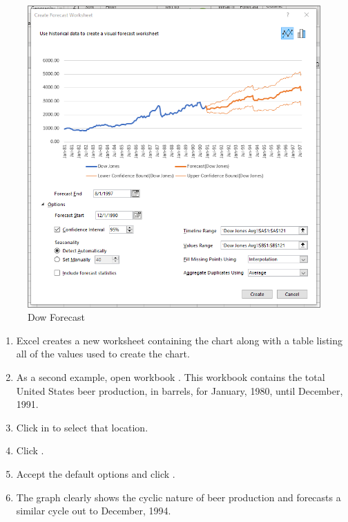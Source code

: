 \begin{figure}[H]
	\centering
	\includegraphics[width=\maxwidth{.95\linewidth}]{gfx/ch08_fig13}
	\caption{Dow Forecast}
	\label{08:fig13}
\end{figure}

\begin{enumerate}[resume]
	\item Excel creates a new worksheet containing the chart along with a table listing all of the values used to create the chart.
	\item As a second example, open workbook . This workbook contains the total United States beer production, in barrels, for January, 1980, until December, 1991. 
	\item Click in  to select that location.
	\item Click .
	\item Accept the default options and click .
	\item The graph clearly shows the cyclic nature of beer production and forecasts a similar cycle out to December, 1994.
\end{enumerate}

